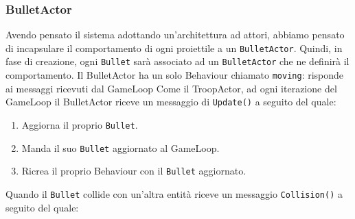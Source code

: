 \subsubsection{BulletActor}
Avendo pensato il sistema adottando un'architettura ad attori, abbiamo pensato di incapsulare il comportamento
di ogni proiettile a un \texttt{BulletActor}. Quindi, in fase di creazione, ogni \texttt{Bullet} sarà associato ad un
\texttt{BulletActor} che ne definirà il comportamento.
Il BulletActor ha un solo Behaviour chiamato \texttt{moving}: risponde ai messaggi ricevuti dal GameLoop
Come il TroopActor, ad ogni iterazione del GameLoop il BulletActor riceve un messaggio di \texttt{Update()} a seguito del quale:
\begin{enumerate}
    \item Aggiorna il proprio \texttt{Bullet}.
    \item Manda il suo \texttt{Bullet} aggiornato al GameLoop.
    \item Ricrea il proprio Behaviour con il \texttt{Bullet} aggiornato.
\end{enumerate}
Quando il \texttt{Bullet} collide con un'altra entità riceve un messaggio \texttt{Collision()} a seguito del quale:
